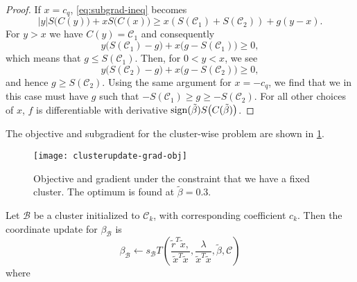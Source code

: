 \begin{proof}
  If \(x = c_q\), \eqref{eq:subgrad-ineq} becomes
  \[
    |y|S\big(C(y)\big) + x S\big(C(x)\big) \geq x(S(\mathcal{C}_1) + S(\mathcal{C}_2)) + g(y - x).
  \]
  For \(y > x\) we have \(C(y) = \mathcal{C}_1\) and consequently
  \[
    y\big(S(\mathcal{C}_1) - g\big) + x\big(g - S(\mathcal{C}_1)\big) \geq 0,
  \]
  which means that \(g \leq S(\mathcal{C}_1)\).
  Then, for \(0 < y < x\), we see
  \[
    y\big(S(\mathcal{C}_2) - g\big) + x(g - S(\mathcal{C}_2)\big) \geq 0,
  \]
  and hence \(g \geq S(\mathcal{C}_2)\).
  Using the same argument for \(x = -c_q\), we find that we in this case
  must have \(g\) such that
  \(-S(\mathcal{C}_1) \geq g \geq - S(\mathcal{C}_2)\).
  For all other choices of \(x\), \(f\) is differentiable with
  derivative \(\operatorname{sign}(\tilde\beta)S\big(C(\tilde\beta)\big)\).
\end{proof}

The objective and subgradient for the cluster-wise problem are shown in
\cref{fig:cluster-grad-obj}.

\begin{figure}[htbp]
  \centering
  \texttt{[image: clusterupdate-grad-obj]}
  \caption{%
    Objective and gradient under the constraint that we have a fixed
    cluster.
    The optimum is found at \(\tilde\beta = 0.3\).
  }%
  \label{fig:cluster-grad-obj}
\end{figure}

Let \(\mathcal{B}\) be a cluster initialized to \(\mathcal{C}_k\), with
corresponding coefficient \(c_k\).
Then the coordinate update for \(\beta_\mathcal{B}\) is
\[
  \beta_\mathcal{B} \gets
  s_\mathcal{B} 
    T \left(
      \frac{
       \tilde r^T \tilde x,
      }{
       \tilde x^T \tilde x
      } , 
      \frac{
        \lambda 
      }{
        \tilde x^T \tilde x
      } ,
      \tilde \beta, \mathcal{C}
    \right)
\]
where

